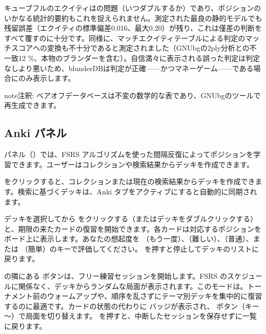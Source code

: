 \documentclass[letterpaper,10pt,dvipdfmx]{sphinxmanual}
\begin{document}
\sphinxAtStartPar
{} キューブフルのエクイティはの問題（いつダブルするか）であり、ポジションのいかなる統計的要約もこれを捉えられません。測定された最良の静的モデルでも残留誤差（エクイティの標準偏差0.016、最大0.20）が残り、これは僅差の判断をすべて覆すのに十分です。同様に、マッチエクイティテーブルによる判定のマッチスコアへの変換も不十分であると測定されました（GNUbgの2\sphinxhyphen{}ply分析との不一致12 \%、本物のブランダーを含む）。自信満々に表示される誤った判定は判定なしより悪いため、blunderDBは判定が正確——かつマネーゲーム——である場合にのみ表示します。

\begin{sphinxadmonition}{note}{注釈:}
\sphinxAtStartPar
ベアオフデータベースは不変の数学的な表であり、GNUbgのツールで再生成できます。
\end{sphinxadmonition}


\subsection{Anki パネル}
\label{\detokenize{manuel:panneau-anki}}\label{\detokenize{manuel:id10}}
\sphinxAtStartPar
{} パネル（）では、FSRS アルゴリズムを使った間隔反復によってポジションを学習できます。ユーザーはコレクションや検索結果からデッキを作成できます。

\sphinxAtStartPar
{}  をクリックすると、コレクションまたは現在の検索結果からデッキを作成できます。検索に基づくデッキは、Anki タブをアクティブにすると自動的に同期されます。

\sphinxAtStartPar
{} デッキを選択してから  をクリックする（またはデッキをダブルクリックする）と、期限の来たカードの復習を開始できます。各カードは対応するポジションをボード上に表示します。あなたの想起度を （もう一度）、（難しい）、（普通）、または （簡単）のキーで評価してください。 を押すと停止してデッキのリストに戻ります。

\sphinxAtStartPar
{}  の隣にある  ボタンは、フリー練習セッションを開始します。FSRS のスケジュールに関係なく、デッキからランダムな局面が表示されます。このモードは。トーナメント前のウォームアップや、順序を乱さずにテーマ別デッキを集中的に復習するのに最適です。カードの状態の代わりに  バッジが表示され、 ボタン（キー 〜）で局面を切り替えます。 を押すと、中断したセッションを保存せずに一覧に戻ります。
\end{document}
